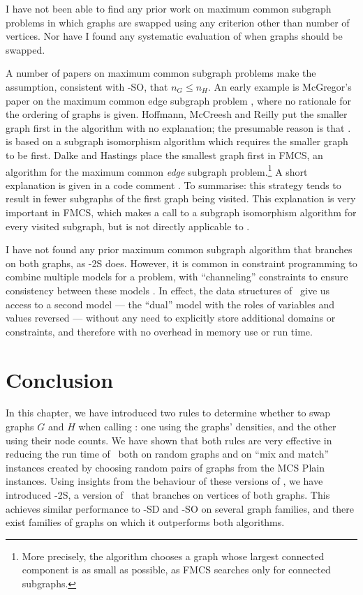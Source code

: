 I have not been able to find any prior work on maximum common subgraph problems in which
graphs are swapped using any criterion other than number of vertices.  Nor have I found
any systematic evaluation of when graphs should be swapped.

A number of papers on maximum common subgraph problems make the assumption, consistent
with \McSplit-SO, that $n_G \leq n_H$.  An early example
is McGregor's paper on the maximum common edge subgraph problem \cite{DBLP:journals/spe/McGregor82},
where no rationale for the ordering of graphs is given.
Hoffmann, McCreesh and Reilly \cite{UpcomingAAAIPaper} put the smaller graph first
in the \kDown algorithm with no explanation; the presumable reason is that \kDown.
is based on a subgraph isomorphism algorithm which requires the smaller graph to be first.
Dalke and Hastings \cite{DBLP:journals/jcheminf/DalkeH13} place the smallest
graph first in FMCS, an algorithm for the maximum
common \emph{edge} subgraph problem.\footnote{More precisely, the algorithm chooses a graph whose largest
connected component is as small as possible, as FMCS searches only for connected subgraphs.}
A short explanation is given in a code comment \cite{DalkeFmcsSource}. To summarise: this strategy tends to
result in fewer subgraphs of the first graph being visited.  This explanation is very
important in FMCS, which makes a call to a subgraph isomorphism algorithm for every visited
subgraph, but is not directly applicable to \McSplit.

I have not found any prior maximum common subgraph algorithm that branches on both graphs,
as \McSplit-2S does.  However, it is common in constraint programming to combine multiple models
for a problem, with ``channeling'' constraints to ensure consistency between these models
\cite{DBLP:journals/constraints/ChengCLW99}.  In effect, the data structures of \McSplit\
give us access to a second model --- the ``dual'' model with the roles of variables and values
reversed \cite{DBLP:conf/ecai/Geelen92} --- without any need to explicitly store additional
domains or constraints, and therefore with no overhead in memory use
or run time.

\section{Conclusion}\label{sec:swapping-conclusion}

In this chapter, we have introduced two rules to determine whether to swap graphs $G$ and $H$
when calling \McSplit: one using the graphs' densities, and the other using their node counts.
We have shown that both rules are very effective in reducing the run time of \McSplit\ both on random
graphs and on ``mix and match'' instances created by choosing random pairs of graphs from the
MCS Plain instances.  Using insights from the behaviour of these versions of \McSplit, we have
introduced \McSplit-2S, a version of \McSplit\ that branches on vertices of both graphs.
This achieves similar performance to \McSplit-SD and \McSplit-SO on several graph
families, and there exist families of graphs on which it outperforms both
algorithms.

